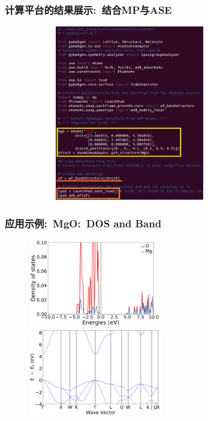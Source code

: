 \documentclass[cjk,slidestop,compress,mathserif,blue]{beamer}
\begin{document}
%
\frame
{
	\frametitle{\textrm{计算平台的结果展示:~结合\textrm{MP}与\textrm{ASE}}}
\begin{figure}[h!]
\centering
\vspace*{-0.2in}
\includegraphics[height=3.0in,width=3.5in,viewport=0 0 600 550,clip]{Figures/Atomate-ASE_MgO.png}
\label{Atomate-ASE_app}
\end{figure} 
}

\frame
{
	\frametitle{应用示例:~\textrm{MgO:~DOS and Band}}
\begin{figure}[h!]
\centering
\vspace*{-0.16in}
\includegraphics[height=1.5in,width=2.3in,viewport=0 0 900 600,clip]{Figures/Atomate_MgO-DOS.png}
\vskip 0.5pt
\includegraphics[height=1.5in,width=2.3in,viewport=0 0 900 600,clip]{Figures/Atomate_MgO-Band.png}
\label{Atomate_MgO-DOS}
\end{figure} 
}
\end{document}
